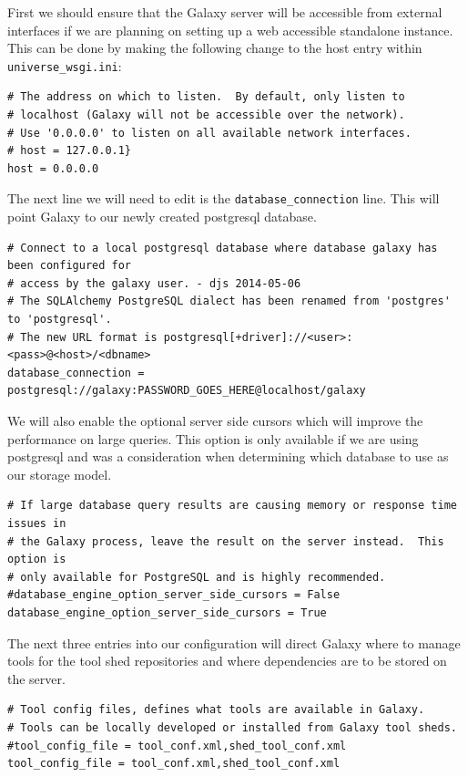 \documentclass[a4paper,10pt]{article}
\begin{document}
First we should ensure that the Galaxy server will be accessible from external interfaces if we are planning on setting up a web accessible standalone instance.  This can be done by making the following change to the host entry within \texttt{\footnotesize{universe\_wsgi.ini}}:

\begin{lstlisting}
# The address on which to listen.  By default, only listen to
# localhost (Galaxy will not be accessible over the network).
# Use '0.0.0.0' to listen on all available network interfaces.
# host = 127.0.0.1}
host = 0.0.0.0
\end{lstlisting}

The next line we will need to edit is the \texttt{\footnotesize{database\_connection}} line.  This will point Galaxy to our newly created postgresql database.

\begin{lstlisting}
# Connect to a local postgresql database where database galaxy has been configured for
# access by the galaxy user. - djs 2014-05-06
# The SQLAlchemy PostgreSQL dialect has been renamed from 'postgres' to 'postgresql'.
# The new URL format is postgresql[+driver]://<user>:<pass>@<host>/<dbname>
database_connection = postgresql://galaxy:PASSWORD_GOES_HERE@localhost/galaxy
\end{lstlisting}

We will also enable the optional server side cursors which will improve the performance on large queries.  This option is only available if we are using postgresql and was a consideration when determining which database to use as our storage model.

\begin{lstlisting}
# If large database query results are causing memory or response time issues in
# the Galaxy process, leave the result on the server instead.  This option is
# only available for PostgreSQL and is highly recommended.
#database_engine_option_server_side_cursors = False
database_engine_option_server_side_cursors = True
\end{lstlisting}

The next three entries into our configuration will direct Galaxy where to manage tools for the tool shed repositories and where dependencies are to be stored on the server.

\begin{lstlisting}
# Tool config files, defines what tools are available in Galaxy.
# Tools can be locally developed or installed from Galaxy tool sheds.
#tool_config_file = tool_conf.xml,shed_tool_conf.xml
tool_config_file = tool_conf.xml,shed_tool_conf.xml
\end{lstlisting}
\end{document}
